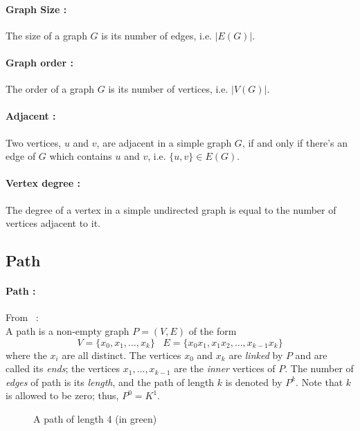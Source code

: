 \paragraph{Graph Size :}
The size of a graph $G$ is its number of edges, i.e. $|E(G)|$.

\paragraph{Graph order :}
The order of a graph $G$ is its number of vertices, i.e. $|V(G)|$.

\paragraph{Adjacent :}
Two vertices, $u$ and $v$, are adjacent in a simple graph $G$, if and only if
there's an edge of $G$ which contains $u$ and $v$, i.e. $\{u,v\} \in E(G)$.

\paragraph{Vertex degree :}
The degree of a vertex in a simple undirected graph is equal to the number of
vertices adjacent to it.

\subsection{Path}
\paragraph{Path :}
From~\cite{Diestel} :\\
A path is a non-empty graph $P = (V, E)$ of the form
$$ V = \{x_0,x_1, \dots, x_k \} \;\;\; E=\{x_0x_1, x_1x_2, \dots, x_{k-1}x_k \}$$
where the $x_i$ are all distinct. The vertices $x_0$ and $x_k$ are {\em linked}
by $P$ and are called its {\em ends}; the vertices $x_1, \dots, x_{k-1}$ are the
{\em inner} vertices of $P$. The number of {\em edges} of path is its
{\em length}, and the path of length $k$ is denoted by $P^k$. Note that $k$ is
allowed to be zero; thus, $P^0 = K^1$.

\begin{figure}[!h]
  \begin{center}
    
  \end{center}
  \caption{A path of length 4 (in green)}
\end{figure}

